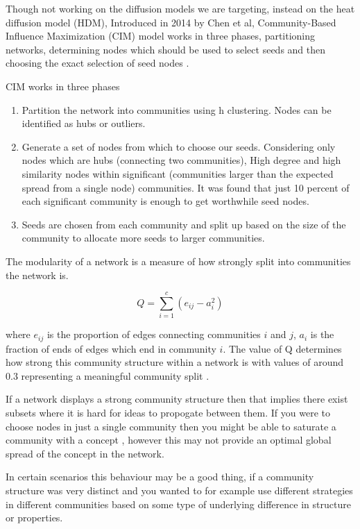 \documentclass{article}
\begin{document}
Though not working on the diffusion models we are targeting, instead on the heat diffusion model (HDM),
Introduced in 2014 by Chen et al, Community-Based Influence Maximization (CIM) model works in three phases, partitioning networks, determining nodes which should be used to select seeds and then choosing the exact selection of seed nodes \cite{cim}.

CIM works in three phases
\begin{enumerate}
	\item Partition the network into communities using h clustering. Nodes can be identified as hubs or outliers.
	\item Generate a set of nodes from which to choose our seeds. Considering only nodes which are hubs (connecting two communities), High degree and high similarity nodes within significant (communities larger than the expected spread from a single node) communities. It was found that just 10 percent of each significant community is enough to get worthwhile seed nodes.
	\item Seeds are chosen from each community and split up based on the size of the community to allocate more seeds to larger communities.
\end{enumerate}

The modularity of a network is a measure of how strongly split into communities the network is.

\begin{equation}
	Q=\sum _{i=1}^{c}(e_{ij}-a_{i}^{2})
\end{equation}

where $e_{ij}$ is the proportion of edges connecting communities $i$ and $j$, $a_i$ is the fraction of ends of edges which end in community $i$.
The value of Q determines how strong this community structure within a network is with values of around 0.3 representing a meaningful community split \cite{clausetnewman}.

If a network displays a strong community structure then that implies there exist subsets where it is hard for ideas to propogate between them.
If you were to choose nodes in just a single community then you might be able to saturate a community with a concept \cite{cim}, however this may not provide an optimal global spread of the concept in the network.

In certain scenarios this behaviour may be a good thing, if a community structure was very distinct and you wanted to for example use different strategies in different communities based on some type of underlying difference in structure or properties.
\end{document}

